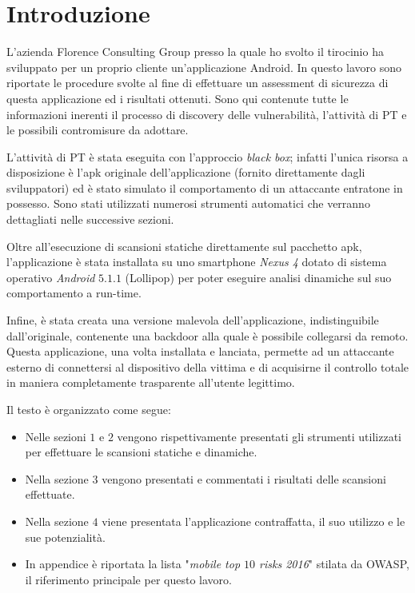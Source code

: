 \chapter*{Introduzione}
L'azienda Florence Consulting Group presso la quale ho svolto il tirocinio ha sviluppato per un proprio cliente un'applicazione Android. In questo lavoro sono riportate le procedure svolte al fine di effettuare un assessment di sicurezza di questa applicazione ed i risultati ottenuti. Sono qui contenute tutte le informazioni inerenti il processo di discovery delle vulnerabilità, l'attività di \ac{PT} e le possibili contromisure da adottare.  

L'attività di PT è stata eseguita con l'approccio \emph{black box}; infatti l'unica risorsa a disposizione è l'apk originale dell'applicazione (fornito direttamente dagli sviluppatori) ed è stato simulato il comportamento di un attaccante entratone in possesso. Sono stati utilizzati numerosi strumenti automatici che verranno dettagliati nelle successive sezioni.

Oltre all'esecuzione di scansioni statiche direttamente sul pacchetto apk, l'applicazione è stata installata su uno smartphone \emph{Nexus 4} dotato di sistema operativo \emph{Android} $5.1.1$ (Lollipop) per poter eseguire analisi dinamiche sul suo comportamento a run-time.

Infine, è stata creata una versione malevola dell'applicazione, indistinguibile dall'originale, contenente una backdoor alla quale è possibile collegarsi da remoto. Questa applicazione, una volta installata e lanciata, permette ad un attaccante esterno di connettersi al dispositivo della vittima e di acquisirne il controllo totale in maniera completamente trasparente all'utente legittimo.

Il testo è organizzato come segue:

\begin{itemize}
	\item Nelle sezioni $1$ e $2$ vengono rispettivamente presentati gli strumenti utilizzati per effettuare le scansioni statiche e dinamiche.
	\item Nella sezione $3$ vengono presentati e commentati i risultati delle scansioni effettuate.
	\item Nella sezione $4$ viene presentata l'applicazione contraffatta, il suo utilizzo e le sue potenzialità.
	\item In appendice è riportata la lista "\emph{mobile top $10$ risks 2016}" stilata da \ac{OWASP}, il riferimento principale per questo lavoro.
\end{itemize}